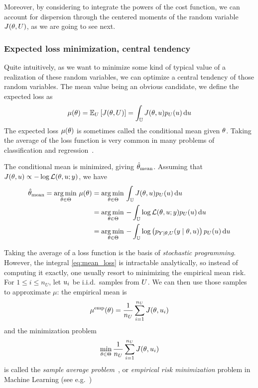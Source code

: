 \documentclass[../../Main_ManuscritThese.tex]{subfiles}
\begin{document}
Moreover, by considering to integrate the powers of the cost function, we can account for dispersion through the centered moments of the random variable $J(\theta, U)$, as we are going to see next.
\subsubsection{Expected loss minimization, central tendency}
\label{sec:exp_loss_minimization}

Quite intuitively, as we want to minimize some kind of typical value of a realization of these random variables, we can optimize a central tendency of those random variables. The mean value being an obvious candidate, we define the expected loss as
\begin{equation}
  \label{eq:mean_loss}
  \mu(\theta) = \mathbb{E}_U\left[J(\theta,U)\right] =\int_{\mathbb{U}} J(\theta,u)p_U(u)\,\mathrm{d}u
\end{equation}
The expected loss $\mu(\theta)$ is sometimes called the conditional mean given $\theta$. Taking the average of the loss function is very common in many problems of classification and regression~\cite{bishop_pattern_2006}.


The conditional mean is minimized, giving $\hat{\theta}_{\mathrm{mean}}$. Assuming that $J(\theta, u) \propto - \log \mathcal{L}(\theta,u;y)$, we have
\begin{align}
  \hat{\theta}_{\mathrm{mean}} = \operatorname*{arg\,min \,}_{\theta\in\Theta} \mu(\theta)&= \operatorname*{arg\,min \,}_{\theta\in\Theta}\int_{\mathbb{U}} J(\theta,u) p_{U}(u)\,\mathrm{d}u \\
                                                            &= \operatorname*{arg\,min \,}_{\theta\in\Theta} - \int_{\mathbb{U}} \log \mathcal{L}(\theta,u;y) p_{U}(u)\,\mathrm{d}u \\
                                                            &= \operatorname*{arg\,min \,}_{\theta\in\Theta} - \int_{\mathbb{U}}\log\left(p_{Y \mid \theta,U}(y \mid \theta,u)\right)p_{U}(u)\,\mathrm{d}u 
\end{align}

Taking the average of a loss function is the basis of \emph{stochastic programming}.
However, the integral \cref{eq:mean_loss} is intractable analytically, so instead of computing it exactly, one usually resort to minimizing the empirical mean risk. For $1\leq i \leq n_U$, let $u_i$ be i.i.d.\ samples from $U$. We can then use those samples to approximate $\mu$: the empirical mean is
\begin{equation}
  \label{eq:emp_mean_loss}
  \mu^{\mathrm{emp}}(\theta) = \frac{1}{n_U}\sum_{i=1}^{n_U} J(\theta, u_i)
\end{equation}
and the minimization problem
\begin{equation}
  \min_{\theta\in\Theta} \frac{1}{n_U}\sum_{i=1}^{n_U} J(\theta, u_i)
\end{equation}
is called the \emph{sample average problem}~\cite{juditsky_stochastic_2009}, or \emph{empirical risk minimization} problem in Machine Learning (see e.g.~\cite{vapnik_principles_1992})
\end{document}
